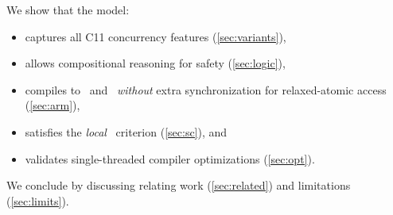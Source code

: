 We show that the model:
\begin{itemize}
\item captures all C11 concurrency features  %
  (\textsection\ref{sec:variants}),

\item allows compositional reasoning for safety %
  (\textsection\ref{sec:logic}),

\item compiles to \armeight\ and \tso\ {\em without} extra synchronization for relaxed-atomic access (\textsection\ref{sec:arm}),

\item  satisfies the \emph{local} \drfsc\ criterion \cite{Dolan:2018:BDR:3192366.3192421} (\textsection\ref{sec:sc}), and

\item validates single-threaded compiler optimizations
  (\textsection\ref{sec:opt}).

\end{itemize}
We conclude by discussing relating work (\textsection\ref{sec:related}) and limitations (\textsection\ref{sec:limits}).








